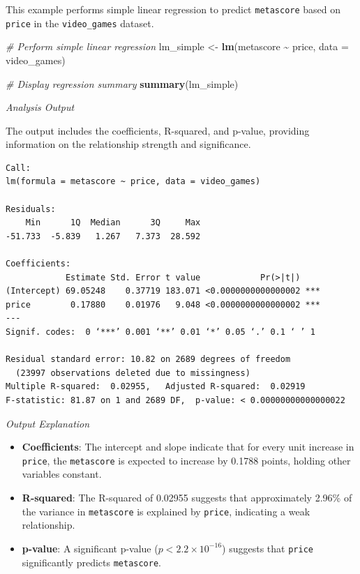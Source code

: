\documentclass[
]{book}
\newenvironment{Shaded}{\begin{snugshade}}{\end{snugshade}}
\newcommand{\AttributeTok}[1]{\textcolor[rgb]{0.13,0.29,0.53}{#1}}
\newcommand{\CommentTok}[1]{\textcolor[rgb]{0.56,0.35,0.01}{\textit{#1}}}
\newcommand{\FunctionTok}[1]{\textcolor[rgb]{0.13,0.29,0.53}{\textbf{#1}}}
\newcommand{\NormalTok}[1]{#1}
\newcommand{\OtherTok}[1]{\textcolor[rgb]{0.56,0.35,0.01}{#1}}
\newcommand{\SpecialCharTok}[1]{\textcolor[rgb]{0.81,0.36,0.00}{\textbf{#1}}}
\providecommand{\tightlist}{%
  \setlength{\itemsep}{0pt}\setlength{\parskip}{0pt}}
\begin{document}
This example performs simple linear regression to predict \texttt{metascore} based on \texttt{price} in the \texttt{video\_games} dataset.

\begin{Shaded}
\begin{Highlighting}[]
\CommentTok{\# Perform simple linear regression}
\NormalTok{lm\_simple }\OtherTok{\textless{}{-}} \FunctionTok{lm}\NormalTok{(metascore }\SpecialCharTok{\textasciitilde{}}\NormalTok{ price, }\AttributeTok{data =}\NormalTok{ video\_games)}

\CommentTok{\# Display regression summary}
\FunctionTok{summary}\NormalTok{(lm\_simple)}
\end{Highlighting}
\end{Shaded}

\emph{Analysis Output}

The output includes the coefficients, R-squared, and p-value, providing information on the relationship strength and significance.

\begin{verbatim}
Call:
lm(formula = metascore ~ price, data = video_games)

Residuals:
    Min      1Q  Median      3Q     Max 
-51.733  -5.839   1.267   7.373  28.592 

Coefficients:
            Estimate Std. Error t value            Pr(>|t|)    
(Intercept) 69.05248    0.37719 183.071 <0.0000000000000002 ***
price        0.17880    0.01976   9.048 <0.0000000000000002 ***
---
Signif. codes:  0 ‘***’ 0.001 ‘**’ 0.01 ‘*’ 0.05 ‘.’ 0.1 ‘ ’ 1

Residual standard error: 10.82 on 2689 degrees of freedom
  (23997 observations deleted due to missingness)
Multiple R-squared:  0.02955,   Adjusted R-squared:  0.02919 
F-statistic: 81.87 on 1 and 2689 DF,  p-value: < 0.00000000000000022
\end{verbatim}

\emph{Output Explanation}

\begin{itemize}
\tightlist
\item
  \textbf{Coefficients}: The intercept and slope indicate that for every unit increase in \texttt{price}, the \texttt{metascore} is expected to increase by 0.1788 points, holding other variables constant.
\item
  \textbf{R-squared}: The R-squared of 0.02955 suggests that approximately 2.96\% of the variance in \texttt{metascore} is explained by \texttt{price}, indicating a weak relationship.
\item
  \textbf{p-value}: A significant p-value (\(p < 2.2 \times 10^{-16}\)) suggests that \texttt{price} significantly predicts \texttt{metascore}.
\end{itemize}
\end{document}
